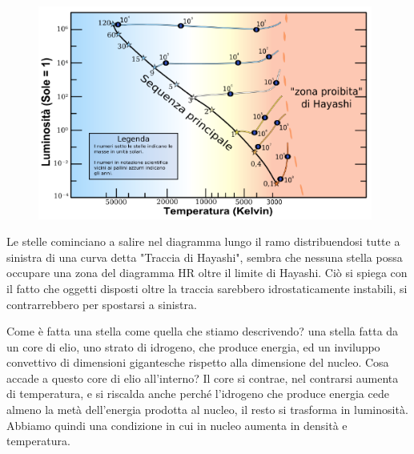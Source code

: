 \begin{figure}[H]
    \centering
    \includegraphics[width=11cm]{Rampo delle giganti rosse e limite di Hayashi.png}
    \label{fig:Rampo delle giganti rosse e limite di Hayashi.png}
\end{figure}

Le stelle cominciano a salire nel diagramma lungo il ramo distribuendosi tutte a sinistra di una curva detta "Traccia di Hayashi", sembra che nessuna stella possa occupare una zona del diagramma HR oltre il limite di Hayashi. Ciò si spiega con il fatto che oggetti disposti oltre la traccia sarebbero idrostaticamente instabili, si contrarrebbero per spostarsi a sinistra.

Come è fatta una stella come quella che stiamo descrivendo? \E una stella fatta da un core di elio, uno strato di idrogeno, che produce energia, ed un inviluppo convettivo di dimensioni gigantesche rispetto alla dimensione del nucleo. Cosa accade a questo core di elio all'interno? Il core si contrae, nel contrarsi aumenta di temperatura, e si riscalda anche perché l'idrogeno che produce energia cede almeno la metà dell'energia prodotta al nucleo, il resto si trasforma in luminosità. Abbiamo quindi una condizione in cui in nucleo aumenta in densità e temperatura.

